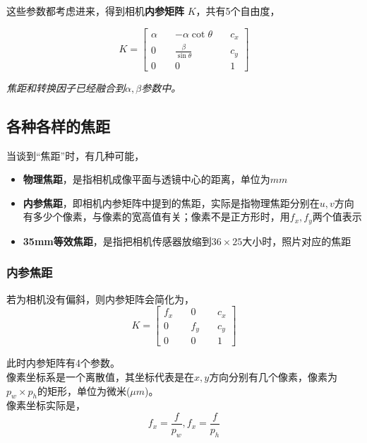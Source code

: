 	这些参数都考虑进来，得到相机\textbf{内参矩阵} $K$，共有5个自由度，

	\begin{equation}
		K = \begin{bmatrix}
			\alpha \quad& -\alpha\cot\theta        \quad& c_x\\
			0      \quad& \frac{\beta}{\sin\theta} \quad& c_y\\
			0      \quad& 0                        \quad& 1
		\end{bmatrix}
	\end{equation}

	\textit{焦距和转换因子已经融合到$\alpha,\beta$参数中。}

\subsection{各种各样的焦距}
	当谈到“焦距”时，有几种可能，
	\begin{itemize}
		\item \textbf{物理焦距}，是指相机成像平面与透镜中心的距离，单位为$mm$
		\item \textbf{内参焦距}，即相机内参矩阵中提到的焦距，实际是指物理焦距分别在$u,v$方向有多少个像素，与像素的宽高值有关；像素不是正方形时，用$f_x,f_y$两个值表示
		\item \textbf{35mm等效焦距}，是指把相机传感器放缩到$36 \times 25$大小时，照片对应的焦距
	\end{itemize}

\subsubsection*{内参焦距}

	若为相机没有偏斜，则内参矩阵会简化为，
	\begin{equation}
		K = \begin{bmatrix}
			f_x 	\quad& 0        \quad& c_x\\
			0		\quad& f_y \quad& c_y\\
			0      \quad& 0                        \quad& 1
		\end{bmatrix}
	\end{equation}

	此时内参矩阵有4个参数。\\

	像素坐标系是一个离散值，其坐标代表是在$x,y$方向分别有几个像素，像素为$p_w \times p_h$的矩形，单位为微米($\mu m$)。\\

	像素坐标实际是，
	$$
		f_x = \frac{f}{p_w}, f_x = \frac{f}{p_h}
	$$

